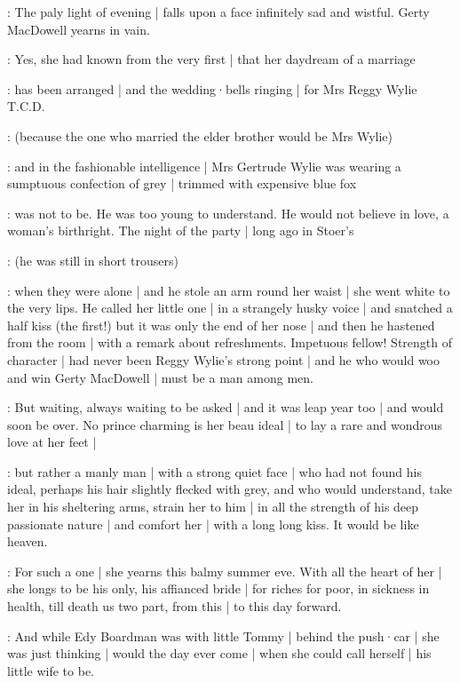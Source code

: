 \gertyNovel:
The paly light of evening |
falls upon a face infinitely sad and wistful.
Gerty MacDowell yearns in vain.

\gertyRomantic:
Yes,
she had known from the very first |
that her daydream of a marriage

\gertyNovel:
has been arranged |
and the wedding·bells ringing |
for Mrs Reggy Wylie T.C.D.

\gertyReal:
(because the one who married the elder brother
would be Mrs Wylie)

\gertyNovel:
and in the fashionable intelligence |
Mrs Gertrude Wylie was wearing a sumptuous confection of grey |
trimmed with expensive blue fox

\gertyRomantic:
was not to be.
He was too young to understand.
He would not believe in love,
a woman's birthright.
The night of the party |
long ago in Stoer's

\gertyReal:
(he was still in short trousers)

\gertyRomantic:
when they were alone |
and he stole an arm round her waist |
she went white
to the very lips.
He called her little one |
in a strangely husky voice |
and snatched a half kiss
(the first!)
but it was only the end of her nose |
and then he hastened from the room |
with a remark about refreshments.
Impetuous fellow!
Strength of character |
had never been Reggy Wylie's strong point |
and he who would woo and win Gerty MacDowell |
must be a man among men.

\gertyNovel:
But waiting,
always waiting to be asked |
and it was leap year too |
and would soon be over.
No prince charming is her beau ideal |
to lay a rare and wondrous love at her feet |

\gertySex:
but rather a manly man |
with a strong quiet face |
who had not found his ideal,
perhaps his hair slightly flecked with grey,
and who would understand,
take her in his sheltering arms,
strain her to him |
in all the strength of his deep passionate nature |
and comfort her |
with a long long kiss.
It would be like heaven.

\gertyRomantic:
For such a one |
she yearns this balmy summer eve.
With all the heart of her |
she longs to be his only,
his affianced bride |
for riches
for poor,
in sickness
in health,
till death us two part,
from this |
to this day forward.

\gertyReal:
And while Edy Boardman was with little Tommy |
behind the push·car |
she was just thinking |
would the day ever come |
when she could call herself |
his little wife to be.%

